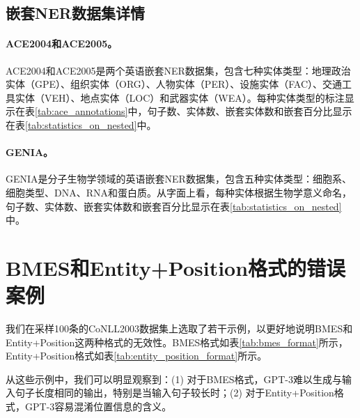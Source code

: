 \documentclass[supercite]{Experimental_Report}
\theoremstyle{definition}
\begin{document}
\subsection{嵌套NER数据集详情}
\label{nested_ner_datasets_details}

\paragraph{ACE2004和ACE2005。}ACE2004\cite{doddington2004automatic}和ACE2005\cite{christopher2006ace}是两个英语嵌套NER数据集，包含七种实体类型：地理政治实体（GPE）、组织实体（ORG）、人物实体（PER）、设施实体（FAC）、交通工具实体（VEH）、地点实体（LOC）和武器实体（WEA）。每种实体类型的标注显示在表\ref{tab:ace_annotations}中，句子数、实体数、嵌套实体数和嵌套百分比显示在表\ref{tab:statistics_on_nested}中。

\paragraph{GENIA。}GENIA是分子生物学领域的英语嵌套NER数据集，包含五种实体类型：细胞系、细胞类型、DNA、RNA和蛋白质。从字面上看，每种实体根据生物学意义命名，句子数、实体数、嵌套实体数和嵌套百分比显示在表\ref{tab:statistics_on_nested}中。

\section{BMES和Entity+Position格式的错误案例}
\label{error_format_example}

我们在采样100条的CoNLL2003数据集上选取了若干示例，以更好地说明BMES和Entity+Position这两种格式的无效性。BMES格式如表\ref{tab:bmes_format}所示，Entity+Position格式如表\ref{tab:entity_position_format}所示。

从这些示例中，我们可以明显观察到：(1) 对于BMES格式，GPT-3难以生成与输入句子长度相同的输出，特别是当输入句子较长时；(2) 对于Entity+Position格式，GPT-3容易混淆位置信息的含义。
\end{document}
